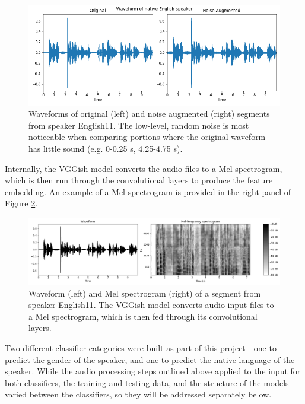 \begin{figure}[h]
\begin{center}
\includegraphics[width=5in]{OrigNoise.png}
\caption{Waveforms of original (left) and noise augmented (right) segments from speaker English11. The low-level, random noise is most noticeable when comparing portions where the original waveform has little sound (e.g. 0-0.25 s, 4.25-4.75 s).}
\label{fig:Noise}
\end{center}
\end{figure}

Internally, the VGGish model converts the audio files to a Mel spectrogram, which is then run through the convolutional layers to produce the feature embedding. An example of a Mel spectrogram is provided in the right panel of Figure \ref{fig:MelSpec}.

\begin{figure}[h]
\begin{center}
\includegraphics[width=5in]{English11MelSpec.png}
\caption{Waveform (left) and Mel spectrogram (right) of a segment from speaker English11. The VGGish model converts audio input files to a Mel spectrogram, which is then fed through its convolutional layers.}
\label{fig:MelSpec}
\end{center}
\end{figure}

Two different classifier categories were built as part of this project - one to predict the gender of the speaker, and one to predict the native language of the speaker. While the audio processing steps outlined above applied to the input for both classifiers, the training and testing data, and the structure of the models varied between the classifiers, so they will be addressed separately below.
